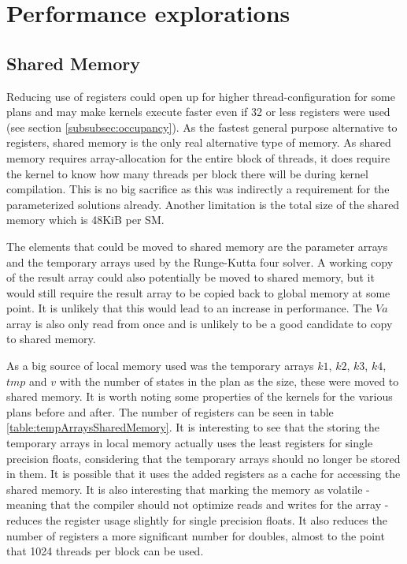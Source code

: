 \section{Performance explorations}
\subsection{Shared Memory}\label{subsec:sharedmem}
Reducing use of registers could open up for higher thread-configuration for some plans and may make kernels execute faster even if 32 or less registers were used (see section \ref{subsubsec:occupancy}).
As the fastest general purpose alternative to registers, shared memory is the only real alternative type of memory.
As shared memory requires array-allocation for the entire block of threads, it does require the kernel to know how many threads per block there will be during kernel compilation.
This is no big sacrifice as this was indirectly a requirement for the parameterized solutions already.
Another limitation is the total size of the shared memory which is 48KiB per SM.

The elements that could be moved to shared memory are the parameter arrays and the temporary arrays used by the Runge-Kutta four solver.
A working copy of the result array could also potentially be moved to shared memory, but it would still require the result array to be copied back to global memory at some point.
It is unlikely that this would lead to an increase in performance.
The $Va$ array is also only read from once and is unlikely to be a good candidate to copy to shared memory.

As a big source of local memory used was the temporary arrays $k1$, $k2$, $k3$, $k4$, $tmp$ and $v$ with the number of states in the plan as the size, these were moved to shared memory.
It is worth noting some properties of the kernels for the various plans before and after.
The number of registers can be seen in table \ref{table:tempArraysSharedMemory}.
It is interesting to see that the storing the temporary arrays in local memory actually uses the least registers for single precision floats, considering that the temporary arrays should no longer be stored in them.
It is possible that it uses the added registers as a cache for accessing the shared memory.
It is also interesting that marking the memory as volatile - meaning that the compiler should not optimize reads and writes for the array - reduces the register usage slightly for single precision floats.
It also reduces the number of registers a more significant number for doubles, almost to the point that 1024 threads per block can be used.

